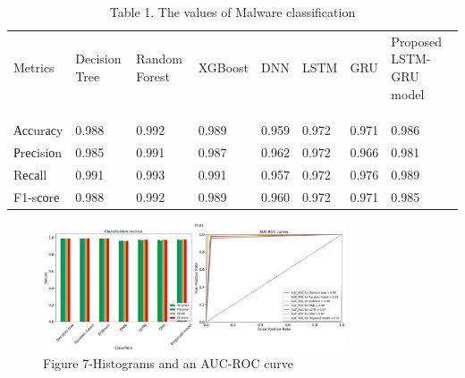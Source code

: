 \begin{table}[H]
\caption*{Table 1. The values of Malware classification}
\centering
\begin{tabular}{|l|l|l|l|l|l|l|l|}
\hline
Metrics   & Decision Tree & Random Forest & XGBoost & DNN   & LSTM  & GRU   & \multirow{1}{2cm}{Proposed LSTM-GRU model} \\ 
& & & & & & & \\
& & & & & & & \\
& & & & & & & \\ \hline
Ассurасy  & 0.988         & 0.992         & 0.989   & 0.959 & 0.972 & 0.971 & 0.986                   \\ \hline
Рrесisiоn & 0.985         & 0.991         & 0.987   & 0.962 & 0.972 & 0.966 & 0.981                   \\ \hline
Rесаll    & 0.991         & 0.993         & 0.991   & 0.957 & 0.972 & 0.976 & 0.989                   \\ \hline
F1-sсоrе  & 0.988         & 0.992         & 0.989   & 0.960 & 0.972 & 0.971 & 0.985                   \\ \hline
\end{tabular}
\end{table}

\begin{figure}[H]
	\centering
	\includegraphics[width=0.8\textwidth]{media/ict/image85}
	\caption*{Figure 7-Histograms and an AUC-ROC curve}
\end{figure}

